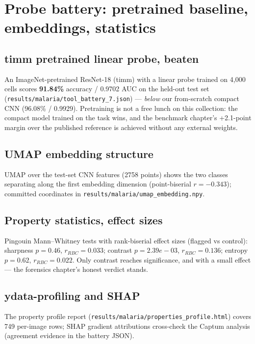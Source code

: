 
\section{Probe battery: pretrained baseline, embeddings, statistics}
\subsection{timm pretrained linear probe, beaten}
An ImageNet-pretrained ResNet-18 (timm) with a linear probe trained on
4{,}000 cells scores \textbf{91.84\%} accuracy /
0.9702 AUC on the held-out test set
(\texttt{results/malaria/tool\_battery\_7.json}) --- \emph{below} our
from-scratch compact CNN (96.08\% / 0.9929). Pretraining is not a free
lunch on this collection: the compact model trained on the task wins, and
the benchmark chapter's +2.1-point margin over the published reference is
achieved without any external weights.
\subsection{UMAP embedding structure}
UMAP over the test-set CNN features (2758 points) shows the two
classes separating along the first embedding dimension (point-biserial
$r = -0.343$); committed coordinates in
\texttt{results/malaria/umap\_embedding.npy}.
\subsection{Property statistics, effect sizes}
Pingouin Mann--Whitney tests with rank-biserial effect sizes (flagged vs
control): sharpness $p=0.46$,
$r_{RBC}=0.033$; contrast
$p=2.39e-03$, $r_{RBC}=0.136$;
entropy $p=0.62$, $r_{RBC}=0.022$.
Only contrast reaches significance, and with a small effect --- the
forensics chapter's honest verdict stands.
\subsection{ydata-profiling and SHAP}
The property profile report (\texttt{results/malaria/properties\_profile.html})
covers 749 per-image rows; SHAP gradient
attributions cross-check the Captum analysis (agreement evidence in the
battery JSON).

